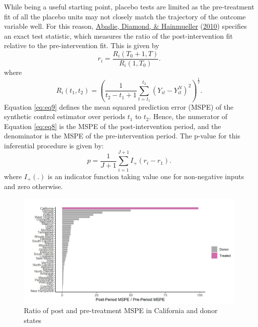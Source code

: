 \documentclass[12pt,nobind, a4paper]{reedthesis}
\begin{document}
 While being a useful starting point, placebo tests are limited as the pre-treatment fit of all the placebo units may not closely match the trajectory of the outcome variable well. For this reason, \protect\hyperlink{ref-abadie_synthetic_2010}{Abadie, Diamond, \& Hainmueller} (\protect\hyperlink{ref-abadie_synthetic_2010}{2010}) specifies an exact test statistic, which measures the ratio of the post-intervention fit relative to the pre-intervention fit. This is given by
 \begin{equation}
 r_{i}= \frac{R_{i}(T_{0}+1,T)}{R_{i}(1,T_{0})}.
 \label{eq:eq8}
 \end{equation}
 where
 \begin{equation}
 R_{i}(t_{1},t_{2})= \left
 (\frac{1}{t_{2}-t_{1}+1} \sum_{t=t_{1}}^{t_{2}}(Y_{it}-Y_{it}^{N})^2\right)^{\frac{1}{2}}.
 \label{eq:eq9}
 \end{equation}
 Equation \eqref{eq:eq9} defines the mean squared prediction error (MSPE) of the synthetic control estimator over periods \(t_{1}\) to \(t_{2}\). Hence, the numerator of Equation \eqref{eq:eq8} is the MSPE of the post-intervention period, and the denominator is the MSPE of the pre-intervention period. The p-value for this inferential procedure is given by:
 \begin{equation}
 p= \frac{1}{J+1} \sum_{i=1}^{J+1}I_{+}(r_{i}-r_{1}).
 \label{eq:eq10}
 \end{equation}
 where \(I_{+}(.)\) is an indicator function taking value one for non-negative inputs and zero otherwise.
 \begin{figure}

 {\centering \includegraphics[width=1\linewidth]{figure/calmspe} 

 }

 \caption{Ratio of post and pre-treatment MSPE in California and donor states}\label{fig:mspe}
 \end{figure}
\end{document}
